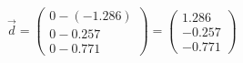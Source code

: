 \documentclass[preview]{standalone}
\begin{document}
\begin{center}
$\vec{d} = \begin{pmatrix}0 - (-1.286) \\ 0 - 0.257 \\ 0 - 0.771\end{pmatrix} = \begin{pmatrix} 1.286 \\ -0.257 \\ -0.771\end{pmatrix}$
\end{center}
\end{document}

